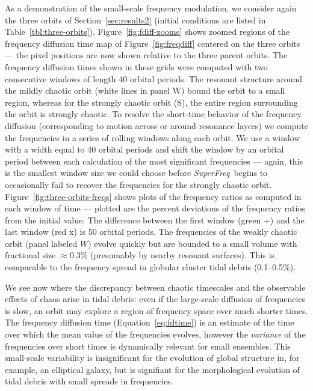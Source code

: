 \documentclass[letterpaper,12pt,preprint]{aastex}
\newcommand{\project}[1]{\textsl{#1}}
\newcommand{\superfreq}{\project{SuperFreq}}
\newcommand{\todo}[2]{{\color{red} TODO: (\MakeUppercase{#1}) #2}}
\begin{document}
As a demonstration of the small-scale frequency modulation, we consider again the three orbits of Section~\ref{sec:results2} (initial conditions are listed in Table~\ref{tbl:three-orbits}). Figure~\ref{fig:fdiff-zooms} shows zoomed regions of the frequency diffusion time map of Figure~\ref{fig:freqdiff} centered on the three orbits --- the pixel positions are now shown relative to the three parent orbits. The frequency diffusion times shown in these grids were computed with two consecutive windows of length 40 orbital periods. The resonant structure around the mildly chaotic orbit (white lines in panel W) bound the orbit to a small region, whereas for the strongly chaotic orbit (S), the entire region surrounding the orbit is strongly chaotic. To resolve the short-time behavior of the frequency diffusion (corresponding to motion across or around resonance layers) we compute the frequencies in a series of rolling windows along each orbit. We use a window with a width equal to 40 orbital periods and shift the window by an orbital period between each calculation of the most significant frequencies --- again, this is the smallest window size we could choose before \superfreq\ begins to occasionally fail to recover the frequencies for the strongly chaotic orbit.  Figure~\ref{fig:three-orbits-freqs} shows plots of the frequency ratios as computed in each window of time --- plotted are the percent deviations of the frequency ratios from the initial value. The difference between the first window (green +) and the last window (red x) is 50 orbital periods. The frequencies of the weakly chaotic orbit (panel labeled $W$) evolve quickly but are bounded to a small volume with fractional size $\approx$0.3\% (presumably by nearby resonant surfaces). This is comparable to the frequency spread in globular cluster tidal debris (0.1--0.5\%). %

We see now where the discrepancy between chaotic timescales and the observable effects of chaos arise in tidal debris: even if the large-scale diffusion of frequencies is slow, an orbit may explore a  region of frequency space over much shorter times. The frequency diffusion time (Equation~\ref{eq:fdtime}) is an estimate of the time over which the mean value of the frequencies evolves, however the \emph{variance} of the frequencies over short times is dynamically relevant for small ensembles. This small-scale variability is insignificant for the evolution of global structure in, for example, an elliptical galaxy, but is signifiant for the morphological evolution of tidal debris with small spreads in frequencies. 
\end{document}
